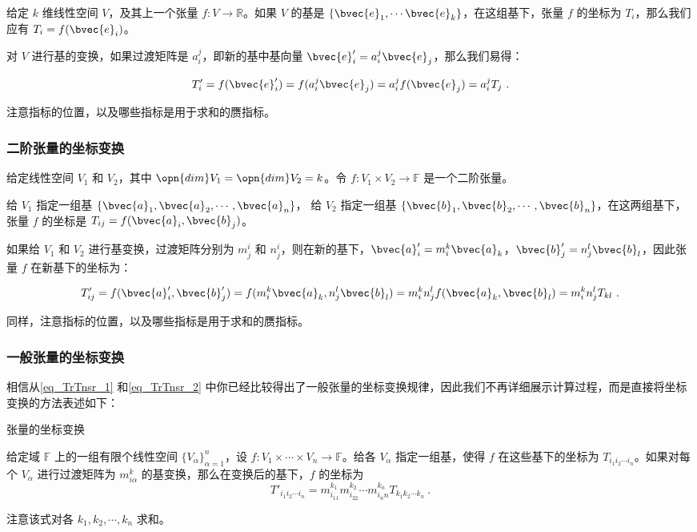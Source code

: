 给定 $k$ 维线性空间 $V$，及其上一个张量 $f:V\rightarrow\mathbb{R}$。如果 $V$ 的基是 $\{\bvec{e}_1, \cdots\bvec{e}_k\}$，在这组基下，张量 $f$ 的坐标为 $T_{i}$，那么我们应有 $T_{i}=f(\bvec{e}_i)$。

对 $V$ 进行基的变换，如果过渡矩阵是 $a_{i}^j$，即新的基中基向量 $\bvec{e}'_{i}=a_{i}^j\bvec{e}_j$，那么我们易得：

\begin{equation}\label{eq_TrTnsr_1}
T'_{i}=f(\bvec{e}'_i)=f(a_{i}^j\bvec{e}_j)=a_{i}^jf(\bvec{e}_j)=a_{i}^jT_{j}~.
\end{equation}

注意指标的位置，以及哪些指标是用于求和的赝指标。

\subsubsection{二阶张量的坐标变换}

给定线性空间 $V_1$ 和 $V_2$，其中 $\opn{dim}V_1=\opn{dim}V_2=k$。令 $f:V_1\times V_2\rightarrow\mathbb{F}$ 是一个二阶张量。

给 $V_1$ 指定一组基 $\{\bvec{a}_1, \bvec{a}_2, \cdots, \bvec{a}_n\}$， 给 $V_2$ 指定一组基 $\{\bvec{b}_1, \bvec{b}_2, \cdots, \bvec{b}_n\}$，在这两组基下，张量 $f$ 的坐标是 $T_{ij}=f(\bvec{a}_i, \bvec{b}_j)$。

如果给 $V_1$ 和 $V_2$ 进行基变换，过渡矩阵分别为 $m^{i}_j$ 和 $n^{i}_j$，则在新的基下，$\bvec{a}'_i=m^{k}_i\bvec{a}_k$，$\bvec{b}'_j=n^{l}_j\bvec{b}_l$，因此张量 $f$ 在新基下的坐标为：

\begin{equation}\label{eq_TrTnsr_2}
T'_{ij}=f(\bvec{a}'_i, \bvec{b}'_j)=f(m^{k}_i\bvec{a}_k, n^{l}_j\bvec{b}_l)=m^{k}_in^{l}_jf(\bvec{a}_k, \bvec{b}_l)=m^{k}_in^{l}_jT_{kl}~.
\end{equation}

同样，注意指标的位置，以及哪些指标是用于求和的赝指标。

\subsubsection{一般张量的坐标变换}

相信从\autoref{eq_TrTnsr_1} 和\autoref{eq_TrTnsr_2} 中你已经比较得出了一般张量的坐标变换规律，因此我们不再详细展示计算过程，而是直接将坐标变换的方法表述如下：

\begin{theorem}{张量的坐标变换}\label{the_TrTnsr_1}

给定域 $\mathbb{F}$ 上的一组有限个线性空间 $\{V_\alpha\}^n_{\alpha=1}$，设 $f:V_1\times\cdots\times V_n\rightarrow\mathbb{F}$。给各 $V_\alpha$ 指定一组基，使得 $f$ 在这些基下的坐标为 $T_{i_1i_2\cdots i_n}$。如果对每个 $V_\alpha$ 进行过渡矩阵为 $m^k_{i\alpha}$ 的基变换，那么在变换后的基下，$f$ 的坐标为
\begin{equation}
T'_{i_1i_2\cdots i_n}=m^{k_1}_{i_11}m^{k_2}_{i_22}\cdots m^{k_n}_{i_nn}T_{k_1k_2\cdots k_n}~.
\end{equation}

注意该式对各 $k_1, k_2, \cdots, k_n$ 求和。
\end{theorem}

